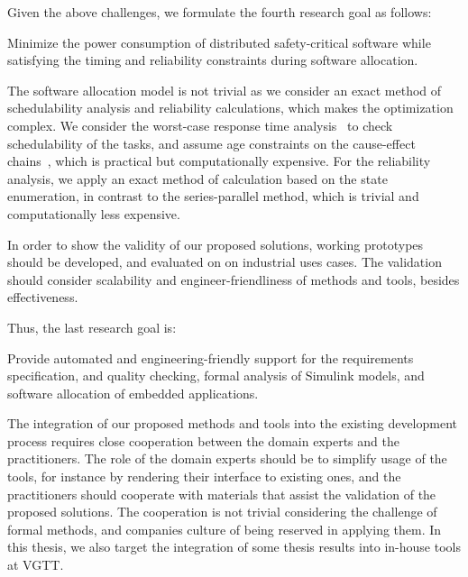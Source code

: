 Given the above challenges, we formulate the fourth research goal as follows:
\begin{researchgoal}
 Minimize the power consumption of distributed safety-critical software while satisfying the timing and reliability constraints during software allocation.
\end{researchgoal}

The software allocation model is not trivial as we consider an exact method of schedulability analysis and reliability calculations, which makes the optimization complex. We consider the worst-case response time analysis~\cite{Baruah2011Response-timeSystems}\cite{Davis2007ControllerRevised} to check schedulability of the tasks, and assume age constraints on the cause-effect chains~\cite{mubeen2013support}, which is practical but computationally expensive. For the reliability analysis, we apply an exact method of calculation based on the state enumeration, in contrast to the series-parallel method, which is trivial and computationally less expensive. 

In order to show the validity of our proposed solutions, working prototypes should be developed, and evaluated on on industrial uses cases. The validation should consider scalability and engineer-friendliness of methods and tools, besides effectiveness. 

Thus, the last research goal is:
\begin{researchgoal}
 Provide automated and engineering-friendly support for the requirements specification, and quality checking, formal analysis of Simulink models, and software allocation of embedded applications. 
\end{researchgoal}

The  integration of our proposed methods and tools into the existing development process requires close cooperation between the domain experts and the practitioners. The role of the domain experts should be to simplify usage of the tools, for instance by rendering their interface to existing ones, and the practitioners should cooperate with materials that assist the validation of the proposed solutions. The cooperation is not trivial considering the challenge of formal methods, and companies culture of being reserved in applying them. In this thesis, we also target the integration of some thesis results into in-house tools at VGTT.
